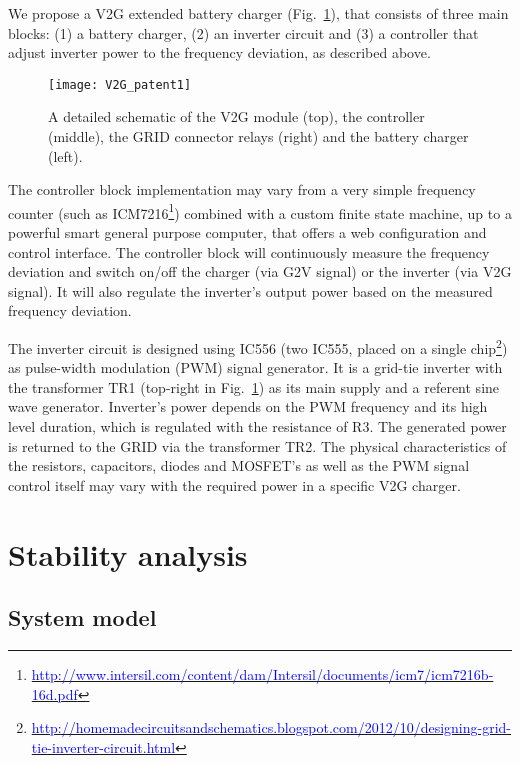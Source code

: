 \documentclass[final,12pt]{elsarticle}
\begin{document}
We propose a V2G extended battery charger
(Fig.~\ref{fig:hw_schematic}), that consists of three main
blocks:
(1) a battery charger, (2) an inverter circuit and (3) a controller that adjust inverter power to the frequency deviation, as described above.

\begin{figure}[!htb]
\centering
\texttt{[image: V2G\_patent1]}
\caption{A detailed schematic of the V2G module (top), the controller (middle),
the GRID connector relays (right) and the battery charger (left).}
\label{fig:hw_schematic}
\end{figure}


The controller block implementation may vary from a very simple frequency
counter (such as ICM7216\footnote{\href{http://www.intersil.com/content/dam/Intersil/documents/icm7/icm7216b-16d.pdf}{\textcolor{blue}{http://www.intersil.com/content/dam/Intersil/documents/icm7/icm7216b-16d.pdf}}}) combined with a custom finite state machine, up to a powerful smart general
purpose computer, that offers a web configuration and control interface.
The controller block will continuously measure the frequency deviation and
switch on/off the charger (via G2V signal) or the inverter (via V2G signal). It will also regulate the inverter's output power based on the measured frequency deviation.

The inverter circuit is designed using IC556 (two IC555, placed on a single chip\footnote{\href{http://homemadecircuitsandschematics.blogspot.com/2012/10/designing-grid-tie-inverter-circuit.html}{\textcolor{blue}{http://homemadecircuitsandschematics.blogspot.com/2012/10/designing-grid-tie-inverter-circuit.html}}}) 
as pulse-width modulation (PWM) signal generator. It is a grid-tie inverter
with the transformer TR1 (top-right in Fig.~\ref{fig:hw_schematic}) as its
main supply and a referent sine wave generator. Inverter's power
depends on the PWM frequency and its high level duration, which is regulated with the resistance of R3. The generated power is returned to the GRID via the transformer TR2.
The physical characteristics of the resistors,
capacitors, diodes and MOSFET's as well as the PWM signal control itself may vary with the required power in a specific V2G charger.

\section{Stability analysis}
\label{results}

\subsection{System model}
\label{steady_state}
\end{document}
